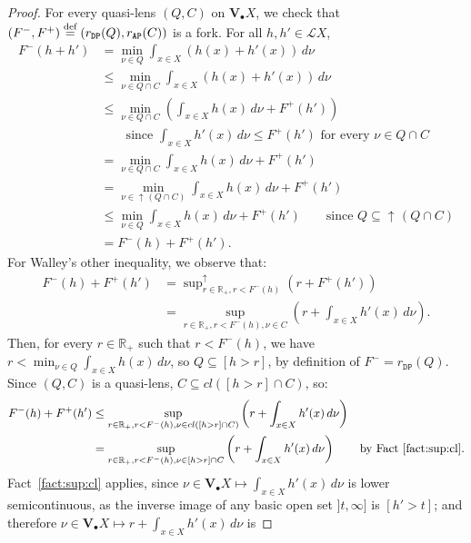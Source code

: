\documentclass[preprint,12pt]{elsarticle}
\newcommand\eqdef{\mathrel{\buildrel \text{def}\over=}}
\newcommand{\Rp}{\mathbb{R}_+}
\DeclareMathOperator{\upc}{\uparrow\!}
\newcommand\Lform{\mathcal L}
\newcommand\Angel{{\mathtt{A}}}
\newcommand\Demon{{\mathtt{D}}}
\newcommand\Nature{{\mathtt{P}}}
\newcommand\AN{{\Angel\Nature}}
\newcommand\DN{{\Demon\Nature}}
\newcommand\Val{{\mathbf V}}
\newcommand\dsup{\sup\nolimits^{\scriptstyle\uparrow}}
\begin{document}
\begin{proof}
  For every quasi-lens $(Q, C)$ on $\Val_\bullet X$, we check that
  $(F^-, F^+) \eqdef (r_\DN (Q), r_\AN (C))$ is a fork.  For all
  $h, h' \in \Lform X$,
  \begin{align*}
    F^- (h+h')
    & = \min_{\nu \in Q} \int_{x \in X} (h (x) + h' (x)) \,d\nu \\
    & \leq \min_{\nu \in Q \cap C} \int_{x \in X} (h (x) + h' (x))
      \,d\nu \\
    & \leq \min_{\nu \in Q \cap C} \left(\int_{x \in X} h (x)\,d\nu
      + F^+ (h')\right) \\
    & \qquad\text{since $\int_{x \in X} h' (x)
      \,d\nu \leq F^+ (h')$ for every $\nu \in Q \cap C$} \\
    & = \min_{\nu \in Q \cap C} \int_{x \in X} h (x)\,d\nu + F^+ (h') \\
    & = \min_{\nu \in \upc (Q \cap C)} \int_{x \in X} h (x)\,d\nu +
      F^+ (h') \\
    & \leq \min_{\nu \in Q} \int_{x \in X} h (x)\,d\nu + F^+
      (h')
    \qquad \text{since $Q \subseteq \upc (Q \cap C)$} \\
    & = F^- (h) + F^+ (h').
  \end{align*}
  For Walley's other inequality, we observe that:
  \begin{align*}
    F^- (h) + F^+ (h')
    & = \dsup_{r \in \Rp, r < F^- (h)} (r + F^+ (h')) \\
    & = \sup_{r \in \Rp, r < F^- (h), \nu \in C} \left(r + \int_{x \in X} h' (x) \,d\nu\right).
  \end{align*}
  Then, for every $r \in \Rp$ such that $r < F^- (h)$, we have
  $r < \min_{\nu \in Q} \int_{x \in X} h (x) \,d\nu$, so
  $Q \subseteq [h > r]$, by definition of $F^- = r_\DN (Q)$.  Since
  $(Q, C)$ is a quasi-lens, $C \subseteq cl ([h > r] \cap C)$, so:
  \begin{align*}
    F^- (h) + F^+ (h')
    & \leq \sup_{r \in \Rp, r < F^- (h), \nu \in cl ([h > r] \cap C)}
      \left(r + \int_{x \in X} h' (x) \,d\nu\right) \\
    & = \sup_{r \in \Rp, r < F^- (h), \nu \in [h > r] \cap C}
      \left(r + \int_{x \in X} h' (x) \,d\nu\right)
    & \text{by Fact~\ref{fact:sup:cl}.}
  \end{align*}
  Fact~\ref{fact:sup:cl} applies, since
  $\nu \in \Val_\bullet X \mapsto \int_{x \in X} h' (x) \,d\nu$ is
  lower semicontinuous, as the inverse image of any basic open set
  $]t, \infty]$ is $[h' > t]$; and therefore
  $\nu \in \Val_\bullet X \mapsto r+\int_{x \in X} h' (x) \,d\nu$ is

\end{proof}
\end{document}
